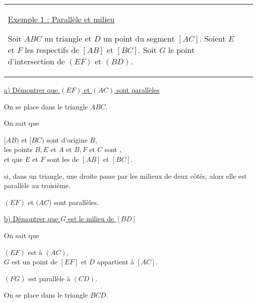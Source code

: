 \begin{tabular}{M{9cm}M{9cm}}
\parbox{10cm}{
\underline{Exemple 1 : Parallèle et milieu}\\
\\
Soit $ABC$ un triangle et $D$ un point du segment $[AC]$. \\
Soient $E$ et $F$ les  respectifs de $[AB]$ et $[BC]$. \\
Soit $G$ le point d'intersection de $(EF)$ et $(BD)$.  
}
 &  
\end{tabular} 

\underline{a) Démontrer que $(EF)$ et $(AC)$ sont parallèles}

\medskip 

On se place dans le triangle $ABC$.


\begin{labeling}{On sait que } 
\item [On sait que ] $[AB)$ et $[BC)$ sont  d'origine $B$,\\
           les points $B, E$ et $A$ et $B, F$ et $C$ sont  , \\
            et que $E$ et $F$ sont les  de $[AB]$ et $[BC]$. 
\item [Or, ] si, dans un triangle, une droite passe par les milieux  de deux côtés, alors elle est parallèle au troisième. 
\item [Donc] $(EF)$ et $(AC$) sont parallèles.             
\end{labeling}

\bigskip 

\underline{b) Démontrer que $G$ est le milieu de $[BD]$}

\begin{labeling}{On sait que } 
\item [On sait que ]  $(EF)$ est  à $(AC)$, \\
                      $G$ est un point de $[EF]$ et $D$ appartient à $[AC]$.\\
\item [Ainsi] $(FG)$ est parallèle à $(CD)$.            
\end{labeling}

On se place dans le triangle $BCD$.

